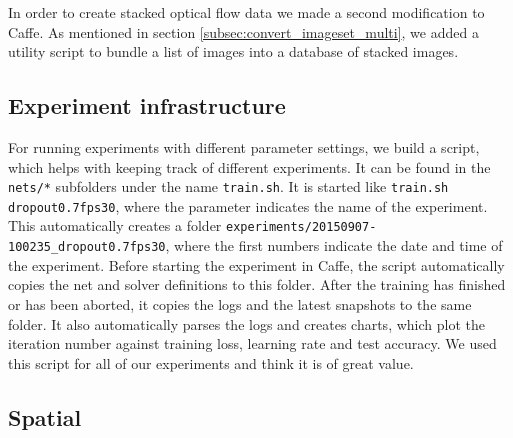 In order to create stacked optical flow data we made a second modification to Caffe. As mentioned in section \ref{subsec:convert_imageset_multi}, we added a utility script to bundle a list of images into a database of stacked images.


\subsection{Experiment infrastructure}
For running experiments with different parameter settings, we build a script, which helps with keeping track of different experiments.
It can be found in the \texttt{nets/*} subfolders under the name \texttt{train.sh}.
It is started like \texttt{train.sh dropout0.7fps30}, where the parameter indicates the name of the experiment.
This automatically creates a folder \texttt{experiments/20150907-100235\_dropout0.7fps30}, where the first numbers indicate the date and time of the experiment.
Before starting the experiment in Caffe, the script automatically copies the net and solver definitions to this folder.
After the training has finished or has been aborted, it copies the logs and the latest snapshots to the same folder.
It also automatically parses the logs and creates charts, which plot the iteration number against training loss, learning rate and test accuracy.
We used this script for all of our experiments and think it is of great value.

\subsection{Spatial}
\label{subsec:spatial}

